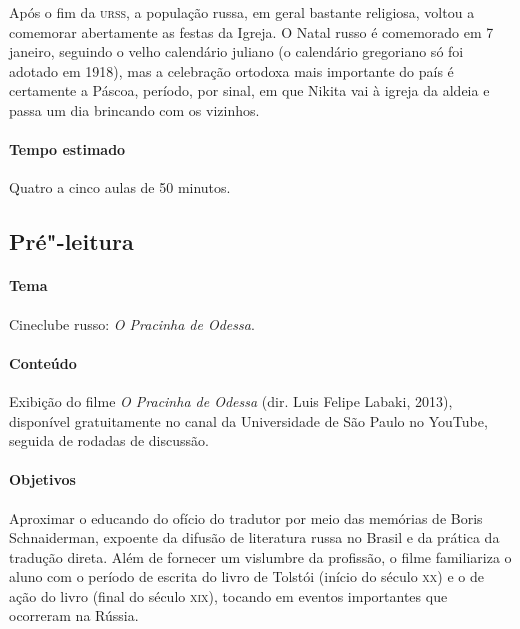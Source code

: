 \documentclass{article}
\begin{document}
Após o fim da \textsc{urss}, a população russa, em geral bastante religiosa,
voltou a comemorar abertamente as festas da Igreja. O Natal russo é
comemorado em 7 janeiro, seguindo o velho calendário juliano (o
calendário gregoriano só foi adotado em 1918), mas a celebração ortodoxa
mais importante do país é certamente a Páscoa, período, por sinal, em
que Nikita vai à igreja da aldeia e passa um dia brincando com os
vizinhos.


\paragraph{Tempo estimado} Quatro a cinco aulas de 50 minutos.

\subsection{Pré"-leitura}

\paragraph{Tema} Cineclube russo: \emph{O Pracinha de Odessa}.


\paragraph{Conteúdo}
Exibição do filme \emph{O Pracinha de Odessa} (dir. Luis Felipe Labaki,
2013), disponível gratuitamente no canal da Universidade de São Paulo no
YouTube, seguida de rodadas de discussão.

\paragraph{Objetivos}
Aproximar o educando do ofício do tradutor por meio das memórias de
Boris Schnaiderman, expoente da difusão de literatura russa no Brasil e
da prática da tradução direta. Além de fornecer um vislumbre da
profissão, o filme familiariza o aluno com o período de escrita do livro
de Tolstói (início do século \textsc{xx}) e o de ação do livro (final do século
\textsc{xix}), tocando em eventos importantes que ocorreram na Rússia.
\end{document}
